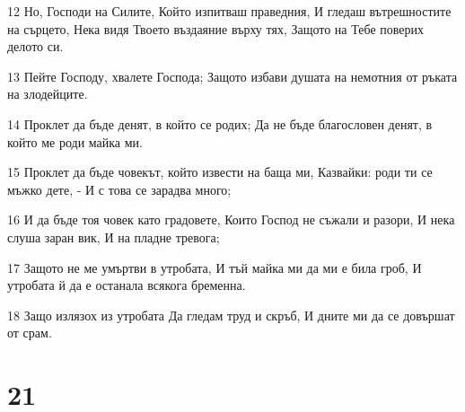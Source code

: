 \par 12 Но, Господи на Силите, Който изпитваш праведния, И гледаш вътрешностите на сърцето, Нека видя Твоето въздаяние върху тях, Защото на Тебе поверих делото си.
\par 13 Пейте Господу, хвалете Господа; Защото избави душата на немотния от ръката на злодейците.
\par 14 Проклет да бъде денят, в който се родих; Да не бъде благословен денят, в който ме роди майка ми.
\par 15 Проклет да бъде човекът, който извести на баща ми, Казвайки: роди ти се мъжко дете, - И с това се зарадва много;
\par 16 И да бъде тоя човек като градовете, Които Господ не съжали и разори, И нека слуша заран вик, И на пладне тревога;
\par 17 Защото не ме умъртви в утробата, И тъй майка ми да ми е била гроб, И утробата й да е останала всякога бременна.
\par 18 Защо излязох из утробата Да гледам труд и скръб, И дните ми да се довършат от срам.

\chapter{21}

